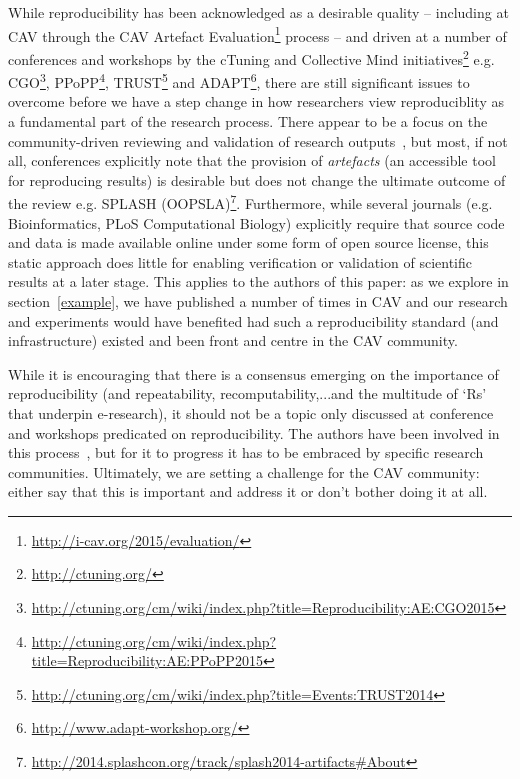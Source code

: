 \documentclass{llncs}
\begin{document}
While reproducibility has been acknowledged as a desirable
quality -- including at CAV
through the CAV Artefact
Evaluation\footnote{\url{http://i-cav.org/2015/evaluation/}} process
-- and driven at a number of conferences and workshops by the cTuning
and Collective Mind initiatives\footnote{\url{http://ctuning.org/}}
e.g. CGO\footnote{\url{http://ctuning.org/cm/wiki/index.php?title=Reproducibility:AE:CGO2015}},
PPoPP\footnote{\url{http://ctuning.org/cm/wiki/index.php?title=Reproducibility:AE:PPoPP2015}},
TRUST\footnote{\url{http://ctuning.org/cm/wiki/index.php?title=Events:TRUST2014}}
and ADAPT\footnote{\url{http://www.adapt-workshop.org/}}, there are
still significant issues to overcome before we have a step change in
how researchers view reproduciblity as a fundamental part of the
research process.  There appear to be a focus on the community-driven
reviewing and validation of research
outputs~\cite{fursin+dubach:2014}, but most, if not all, conferences
explicitly note that the provision of \emph{artefacts} (an accessible
tool for reproducing results) is desirable but does not change the
ultimate outcome of the review e.g. SPLASH
(OOPSLA)\footnote{\url{http://2014.splashcon.org/track/splash2014-artifacts\#About}}. Furthermore, 
while several journals (e.g. Bioinformatics, PLoS Computational
Biology) explicitly require that source code and data is made
available online under some form of open source license, this static
approach does little for enabling verification or validation of
scientific results at a later stage. This applies to the authors of
this paper: as we explore in section~\ref{example}, we have published
a number of times in CAV and our research and experiments would have benefited had
such a reproducibility standard (and infrastructure) existed and been
front and centre in the CAV community.

While it is encouraging that there is a consensus emerging on the
importance of reproducibility (and repeatability, recomputability,...and
the multitude of `Rs' that underpin e-research), it should not be a
topic only discussed at conference and workshops predicated on
reproducibility. The authors have been involved in this
process~\cite{crick+chuehong:2014}, but for it to progress it has to
be embraced by specific research communities. Ultimately, we are
setting a challenge for the CAV community: either say that this is
important and address it or don't bother doing it at all.
\end{document}
